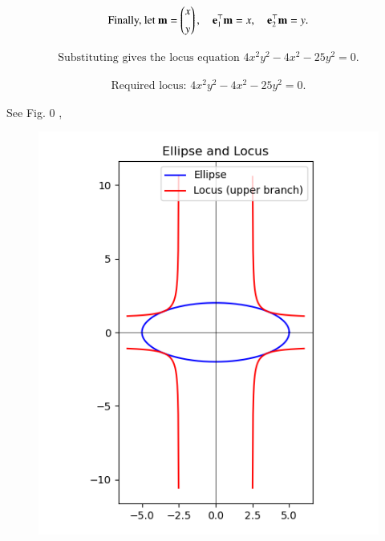 \documentclass[journal]{IEEEtran}
\begin{document}
\begin{align}
\text{Finally, let } 
\mathbf{m}=\begin{pmatrix}x\\[4pt] y\end{pmatrix},
\quad \mathbf{e}_1^\top\mathbf{m}=x,\quad \mathbf{e}_2^\top\mathbf{m}=y.
\end{align}

\begin{align}
\text{Substituting gives the locus equation }
4x^2y^2 - 4x^2 - 25y^2 = 0.
\end{align}

\begin{align}
\text{Required locus: } 4x^2y^2 - 4x^2 - 25y^2 = 0.
\end{align}


\newpage
See Fig. 0 ,
\begin{figure}[H]
\begin{center}
\includegraphics[width=0.6\columnwidth]{figs/fig.png}
\end{center}
\caption{}
\label{fig:Fig1}
\end{figure}
\end{document}
